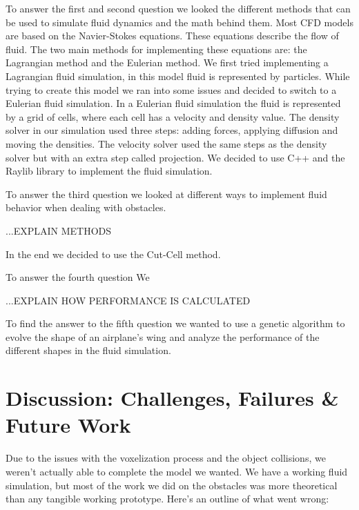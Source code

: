 \documentclass[a4paper,12pt,titlepage]{article}
\begin{document}
To answer the first and second question we looked the different methods that can be used to simulate fluid dynamics and the math behind them.
Most CFD models are based on the Navier-Stokes equations. These equations describe the flow of fluid. 
The two main methods for implementing these equations are: the Lagrangian method and the Eulerian method. 
We first tried implementing a Lagrangian fluid simulation, in this model fluid is represented by particles.
While trying to create this model we ran into some issues and decided to switch to a Eulerian fluid simulation.
In a Eulerian fluid simulation the fluid is represented by a grid of cells, where each cell has a velocity and density value.
The density solver in our simulation used three steps: adding forces, applying diffusion and moving the densities.
The velocity solver used the same steps as the density solver but with an extra step called projection.
We decided to use C++ and the Raylib library to implement the fluid simulation. 

To answer the third question we looked at different ways to implement fluid behavior when dealing with obstacles.

...EXPLAIN METHODS

In the end we decided to use the Cut-Cell method. 

To answer the fourth question We

...EXPLAIN HOW PERFORMANCE IS CALCULATED

To find the answer to the fifth question we wanted to use a genetic algorithm to evolve the shape of an airplane's wing 
and analyze the performance of the different shapes in the fluid simulation. 

\pagebreak
\section{Discussion: Challenges, Failures \& Future Work}
Due to the issues with the voxelization process and the object collisions, we
weren't actually able to complete the model we wanted. We have a working fluid
simulation, but most of the work we did on the obstacles was more theoretical
than any tangible working prototype. Here's an outline of what went wrong:
\end{document}
